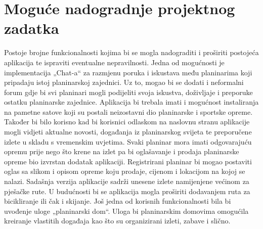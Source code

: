 		\section{Moguće nadogradnje projektnog zadatka}
		Postoje brojne funkcionalnosti kojima bi se mogla nadograditi i proširiti postojeća aplikacija te ispraviti eventualne nepravilnosti. Jedna od mogućnosti je implementacija „Chat-a“ za razmjenu poruka i iskustava među planinarima koji pripadaju istoj planinarskoj zajednici. Uz to, mogao bi se dodati i neformalni forum gdje bi svi planinari mogli podijeliti svoja iskustva, doživljaje i preporuke ostatku planinarske zajednice. Aplikacija bi trebala imati i mogućnost instaliranja na pametne satove koji su postali neizostavni dio planinarske i sportske opreme.  Također bi bilo korisno kad bi korisnici odlaskom na naslovnu stranu aplikacije mogli vidjeti aktualne novosti, događanja iz planinarskog svijeta te preporučene izlete u skladu s vremenskim uvjetima. Svaki planinar mora imati odgovarajuću opremu prije nego što krene na izlet pa bi oglašavanje i prodaja planinarske opreme bio izvrstan dodatak aplikaciji. Registrirani planinar bi mogao postaviti oglas sa slikom i opisom opreme koju prodaje, cijenom i lokacijom na kojoj se nalazi. Sadašnja verzija aplikacije sadrži unesene izlete namijenjene većinom za pješačke rute. U budućnosti bi se aplikacija mogla proširiti dodavanjem ruta za bicikliranje ili čak i skijanje. Još jedna od korisnih funkcionalnosti bila bi uvođenje uloge „planinarski dom“. Uloga bi planinarskim domovima omogućila kreiranje vlastitih događaja kao što su organizirani izleti, zabave i slično. 
		
		\eject
		
	